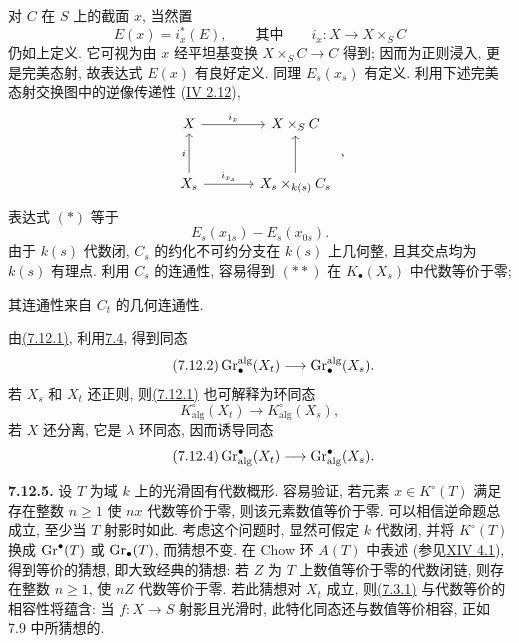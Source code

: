 对 $C$ 在 $S$ 上的截面 $x$, 当然置
\[
E(x)=i_x^*(E),
\qquad\text{其中}\qquad
i_x:X\longrightarrow X\times_SC
\]
仍如上定义. 它可视为由 $x$ 经平坦基变换 $X\times_SC\to C$ 得到; 因而为正则浸入, 更是完美态射, 故表达式 $E(x)$ 有良好定义. 同理 $E_s(x_s)$ 有定义. 利用下述完美态射交换图中的逆像传递性 (\hyperlink{sga6.e04.para.2-12}{IV 2.12}),
%
%
%
%
\[
\begin{tikzcd}[column sep=large,row sep=large]
X \arrow[r,"i_x"] & X\times_SC\\
X_s \arrow[u,"i"] \arrow[r,"i_{x_s}"] &
X_s\times_{k(s)}C_s \arrow[u]
\end{tikzcd}
\;,
\]
表达式 $(*)$ 等于
\[
E_s(x_{1s})-E_s(x_{0s}).
\tag{**}
\]
由于 $k(s)$ 代数闭, $C_s$ 的约化不可约分支在 $k(s)$ 上几何整, 且其交点均为 $k(s)$ 有理点. 利用 $C_s$ 的连通性, 容易得到 $(**)$ 在 $K_\bullet(X_s)$ 中代数等价于零;
%
%
%

其连通性来自 $C_t$ 的几何连通性.

由\hyperlink{sga6.e10.eq.7-12-1}{(7.12.1)}, 利用\hyperlink{sga6.e10.sec.7.4}{7.4}, 得到同态
\begin{equation}\tag{7.12.2}
\operatorname{Gr}_\bullet^{\mathrm{alg}}(X_t)
\longrightarrow \operatorname{Gr}_\bullet^{\mathrm{alg}}(X_s).
\end{equation}
若 $X_s$ 和 $X_t$ 还正则, 则\hyperlink{sga6.e10.eq.7-12-1}{(7.12.1)} 也可解释为环同态
%
\begin{equation}\tag{7.12.3}
K^\circ_{\mathrm{alg}}(X_t)
\longrightarrow K^\circ_{\mathrm{alg}}(X_s),
\end{equation}
若 $X$ 还分离, 它是 $\lambda$ 环同态, 因而诱导同态
%
\begin{equation}\tag{7.12.4}
\operatorname{Gr}^\bullet_{\mathrm{alg}}(X_t)
\longrightarrow \operatorname{Gr}^\bullet_{\mathrm{alg}}(X_s).
\end{equation}

\textbf{7.12.5.} 设 $T$ 为域 $k$ 上的光滑固有代数概形. 容易验证, 若元素 $x\in K^\circ(T)$ 满足存在整数 $n\geq1$ 使 $nx$ 代数等价于零, 则该元素数值等价于零. 可以相信逆命题总成立, 至少当 $T$ 射影时如此. 考虑这个问题时, 显然可假定 $k$ 代数闭, 并将 $K^\circ(T)$ 换成 $\operatorname{Gr}^\bullet(T)$ 或 $\operatorname{Gr}_\bullet(T)$, 而猜想不变. 在 Chow 环 $A(T)$ 中表述 (参见\hyperlink{sga6.e14.para.4-1}{XIV 4.1}), 得到等价的猜想, 即大致经典的猜想: 若 $Z$ 为 $T$ 上数值等价于零的代数闭链, 则存在整数 $n\geq1$, 使 $nZ$ 代数等价于零. 若此猜想对 $X_t$ 成立, 则\hyperlink{sga6.e10.eq.7-3-1}{(7.3.1)} 与代数等价的相容性将蕴含: 当 $f:X\to S$ 射影且光滑时, 此特化同态还与数值等价相容, 正如 7.9 中所猜想的.
%
%
%
%
%
%
%
%
%
%
%
%
%
%
%

